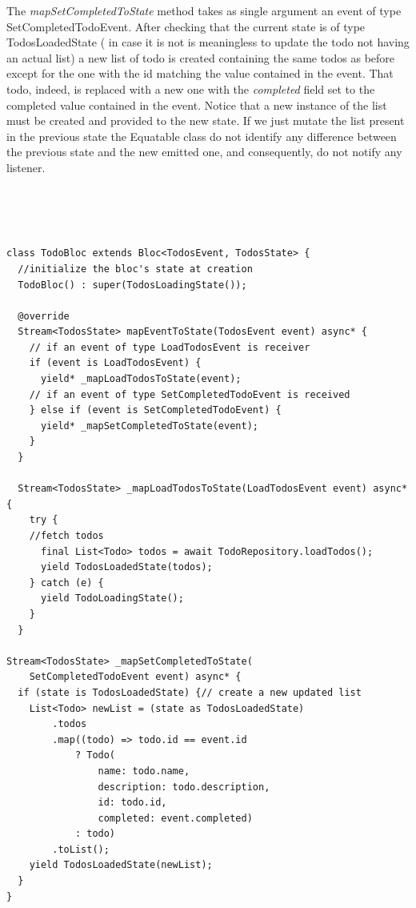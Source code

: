 The \textit{mapSetCompletedToState} method takes as single argument an event of type SetCompletedTodoEvent. After checking that the current state is of type TodosLoadedState ( in case it is not is meaningless to update the todo not having an actual list) a new list of todo is created containing the same todos as before except for the one with the id matching the value contained in the event. That todo, indeed, is replaced with a new one with the \textit{completed} field set to the completed value contained in the event. Notice that a new instance of the list must be created and provided to the new state. If we just mutate the list present in the previous state the Equatable class do not identify any difference between the previous state and the new emitted one, and consequently, do not notify any listener. 
\begin{code}
\mbox{}\\
 \mbox{}
\label{code:2.14}
\begin{verbatim}


class TodoBloc extends Bloc<TodosEvent, TodosState> {
  //initialize the bloc's state at creation
  TodoBloc() : super(TodosLoadingState());

  @override
  Stream<TodosState> mapEventToState(TodosEvent event) async* {
    // if an event of type LoadTodosEvent is receiver
    if (event is LoadTodosEvent) { 
      yield* _mapLoadTodosToState(event);
    // if an event of type SetCompletedTodoEvent is received
    } else if (event is SetCompletedTodoEvent) {
      yield* _mapSetCompletedToState(event);
    } 
  }

  Stream<TodosState> _mapLoadTodosToState(LoadTodosEvent event) async* {
    try {
    //fetch todos
      final List<Todo> todos = await TodoRepository.loadTodos();
      yield TodosLoadedState(todos);
    } catch (e) {
      yield TodoLoadingState();
    }
  }

Stream<TodosState> _mapSetCompletedToState(
    SetCompletedTodoEvent event) async* {
  if (state is TodosLoadedState) {// create a new updated list
    List<Todo> newList = (state as TodosLoadedState)
        .todos
        .map((todo) => todo.id == event.id
            ? Todo(
                name: todo.name,
                description: todo.description,
                id: todo.id,
                completed: event.completed)
            : todo)
        .toList();
    yield TodosLoadedState(newList);
  }
}


\end{verbatim}
\mbox{}
\end{code}
